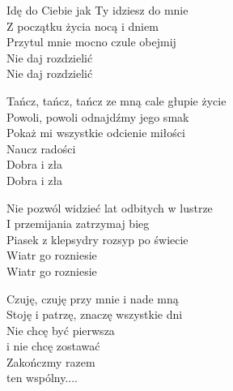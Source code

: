 \begin{text}
    Idę do Ciebie jak Ty idziesz do mnie\\
    Z początku życia nocą i dniem\\
    Przytul mnie mocno czule obejmij\\
    Nie daj rozdzielić\\
    Nie daj rozdzielić

    Tańcz, tańcz, tańcz ze mną cale głupie życie\\
    Powoli, powoli odnajdźmy jego smak\\
    Pokaż mi wszystkie odcienie miłości\\
    Naucz radości\\
    Dobra i zła\\
    Dobra i zła

    Nie pozwól widzieć lat odbitych w lustrze\\
    I przemijania zatrzymaj bieg\\
    Piasek z klepsydry rozsyp po świecie\\
    Wiatr go rozniesie\\
    Wiatr go rozniesie

    Czuję, czuję przy mnie i nade mną\\
    Stoję i patrzę, znaczę wszystkie dni\\
    Nie chcę być pierwsza\\
    i nie chcę zostawać\\
    Zakończmy razem\\
    ten wspólny....
\end{text}
\begin{chord}

\end{chord}